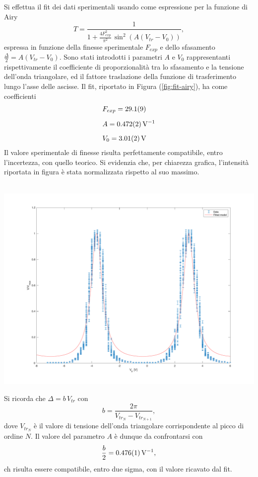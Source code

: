 \documentclass[10pt,oneside,a4paper]{article}
\newenvironment{Figure}
  {\par\medskip\noindent\minipage{\linewidth}}
  {\endminipage\par\medskip}
\begin{document}
\begin{multicols}{2}
Si effettua il fit dei dati sperimentali usando come espressione per la funzione di Airy \begin{equation}\label{eqn:airy}
T=\frac{1}{1+\frac{4F_{exp}^2}{\pi^2}\,\sin^2(A(V_{tr}-V_0))},
\end{equation}
espressa in funzione della finesse sperimentale $F_{exp}$ e dello sfasamento $\frac{\Delta}{2} = A(V_{tr}-V_0)$.  Sono stati introdotti i parametri $A$ e $V_0$ rappresentanti rispettivamente il coefficiente di proporzionalità tra lo sfasamento e la tensione dell'onda triangolare, ed il fattore traslazione della funzione di trasferimento lungo l'asse delle ascisse. Il fit, riportato in Figura (\ref{fig:fit-airy}), ha come coefficienti \begin{align*}
&F_{exp} = \SI{29.1\pm0.9}{}\\[0.2cm]
&A = \SI{0.472\pm0.002}{V^{-1}}\\[0.2cm]
&V_0 = \SI{3.01\pm0.02}{V}
\end{align*}
Il valore sperimentale di finesse risulta perfettamente compatibile, entro l'incertezza, con quello teorico. Si evidenzia che, per chiarezza grafica, l'intensità riportata in figura è stata normalizzata rispetto al suo massimo.
\begin{Figure}
	\begin{center}
	\hbox{\hspace{-0.8cm}
	\includegraphics[width=1.1\linewidth]{fit-airy}}
	\label{fig:fit-airy}
	\end{center}
\end{Figure}
Si ricorda che $\Delta = b\,V_{tr}$ con \[
b = \frac{2\pi}{V_{tr_N}-V_{tr_{N+1}}},
\]
dove $V_{tr_N}$ è il valore di tensione dell'onda triangolare corrispondente al picco di ordine $N$. Il valore del parametro $A$ è dunque da confrontarsi con \[
\frac{b}{2} = \SI{0.476\pm0.001}{V^{-1}},
\]
ch risulta essere compatibile, entro due sigma, con il valore ricavato dal fit.



\end{multicols}
\end{document}

